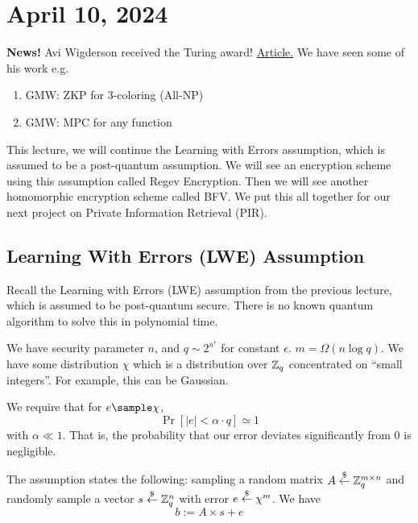 \section{April 10, 2024}
\label{20240410}

\begin{remark}
    \textbf{News!} Avi Wigderson received the Turing award! \href{https://awards.acm.org/about/2023-turing}{Article.} We have seen some of his work e.g.
    \begin{enumerate}
        \item GM{\color{red}W}: ZKP for 3-coloring (All-NP)
        \item GM{\color{red}W}: MPC for any function
    \end{enumerate}
\end{remark}

This lecture, we will continue the Learning with Errors assumption, which is assumed to be a post-quantum assumption. We will see an encryption scheme using this assumption called Regev Encryption. Then we will see another homomorphic encryption scheme called BFV. We put this all together for our next project on Private Information Retrieval (PIR).

\subsection{Learning With Errors (LWE) Assumption}
Recall the Learning with Errors (LWE) assumption from the previous lecture, which is assumed to be post-quantum secure. There is no known quantum algorithm to solve this in polynomial time.

We have security parameter $n$, and $q\sim 2^{n^\epsilon}$ for constant $\epsilon$. $m = \Omega (n\log q)$. We have some distribution $\chi$ which is a distribution over $\mathbb Z_q$ concentrated on ``small integers''. For example, this can be Gaussian.

\begin{center}
\def\svgwidth{0.5\columnwidth}

\end{center}

We require that for $e\sample \chi$, 
\[\Pr[|e| < \alpha\cdot q ]\simeq 1\]
with $\alpha \ll 1$. That is, the probability that our error deviates significantly from $0$ is negligible.

The assumption states the following: sampling a random matrix $A\overset{\$}{\leftarrow} \mathbb Z_q^{m\times n}$ and randomly sample a vector $s\overset{\$}{\leftarrow} \mathbb Z_q^n$ with error $e\overset{\$}{\leftarrow} \chi^m$. We have \[b:=A\times s + e\]

